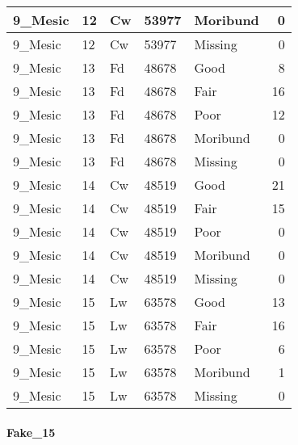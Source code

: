 \documentclass[
]{article}
\begin{document}
\begin{tabular}{l|l|l|l|l|r}
\hline
9\_Mesic & 12 & Cw & 53977 & Moribund & 0\\
\hline
9\_Mesic & 12 & Cw & 53977 & Missing & 0\\
\hline
9\_Mesic & 13 & Fd & 48678 & Good & 8\\
\hline
9\_Mesic & 13 & Fd & 48678 & Fair & 16\\
\hline
9\_Mesic & 13 & Fd & 48678 & Poor & 12\\
\hline
9\_Mesic & 13 & Fd & 48678 & Moribund & 0\\
\hline
9\_Mesic & 13 & Fd & 48678 & Missing & 0\\
\hline
9\_Mesic & 14 & Cw & 48519 & Good & 21\\
\hline
9\_Mesic & 14 & Cw & 48519 & Fair & 15\\
\hline
9\_Mesic & 14 & Cw & 48519 & Poor & 0\\
\hline
9\_Mesic & 14 & Cw & 48519 & Moribund & 0\\
\hline
9\_Mesic & 14 & Cw & 48519 & Missing & 0\\
\hline
9\_Mesic & 15 & Lw & 63578 & Good & 13\\
\hline
9\_Mesic & 15 & Lw & 63578 & Fair & 16\\
\hline
9\_Mesic & 15 & Lw & 63578 & Poor & 6\\
\hline
9\_Mesic & 15 & Lw & 63578 & Moribund & 1\\
\hline
9\_Mesic & 15 & Lw & 63578 & Missing & 0\\
\hline
\end{tabular}

\hypertarget{fake_15-1}{%
\paragraph{Fake\_15}\label{fake_15-1}}
\end{document}
